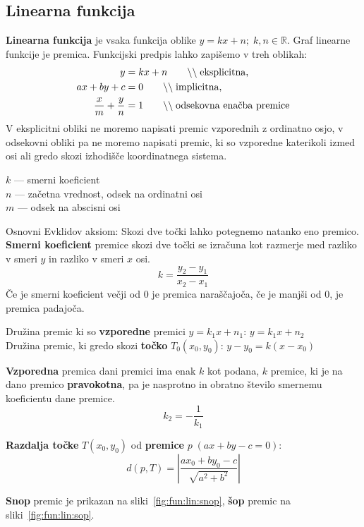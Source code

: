 \documentclass[a4paper,oneside,12pt,fleqn]{article}
\def\R{\ensuremath{\mathbb R}}
\newcommand{\comment}[1]{\ensuremath{\qquad\backslash\backslash\;}\textnormal{#1}}
\numberwithin{equation}{section}
\begin{document}
\subsection{Linearna funkcija}
\textbf{Linearna funkcija} je vsaka funkcija oblike $y = kx + n; \; k, n \in \R$.
Graf linearne funkcije je premica. Funkcijski predpis lahko zapišemo v treh oblikah:
\label{sec:fun:lin}
\begin{align*}
  y &= kx + n \comment{eksplicitna,} \\
  ax + by + c &= 0 \comment{implicitna,} \\
  \frac{x}{m} + \frac{y}{n} &= 1 \comment{odsekovna enačba premice}
\end{align*}
V eksplicitni obliki ne moremo napisati premic vzporednih z ordinatno osjo, v odsekovni
obliki pa ne moremo napisati premic, ki so vzporedne katerikoli izmed osi ali gredo skozi
izhodišče koordinatnega sistema.

$k$ --- smerni koeficient \\
$n$ --- začetna vrednost, odsek na ordinatni osi \\
$m$ --- odsek na abscisni osi

Osnovni Evklidov aksiom: Skozi dve točki lahko potegnemo natanko eno premico.
\textbf{Smerni koeficient} premice skozi dve točki se izračuna kot razmerje med razliko v smeri $y$
in razliko v smeri $x$ osi.
\[ k = \frac{y_2 - y_1}{x_2 - x_1} \]
Če je smerni koeficient večji od 0 je premica naraščajoča, če je manjši od 0, je premica
padajoča.

Družina premic ki so \textbf{vzporedne} premici $y = k_1x+n_1$: $y=k_1x+n_2$ \\
Družina premic, ki gredo skozi \textbf{točko} $T_0(x_0,y_0)$: $y - y_0 = k(x-x_0)$

\textbf{Vzporedna} premica dani premici ima enak $k$ kot podana, $k$ premice, ki je na dano premico
\textbf{pravokotna}, pa je nasprotno in obratno število smernemu koeficientu dane premice.
\[ k_2 = -\frac{1}{k_1} \]

\textbf{Razdalja točke} $T(x_0, y_0)$ od \textbf{premice} $p\;(ax+by-c=0)$:
\[ d(p, T) = \left|\frac{ax_0+by_0-c}{\sqrt{a^2+b^2}}\right|  \]

\textbf{Snop} premic je prikazan na sliki~\ref{fig:fun:lin:snop}, \textbf{šop} premic na sliki~\ref{fig:fun:lin:sop}.
\end{document}
